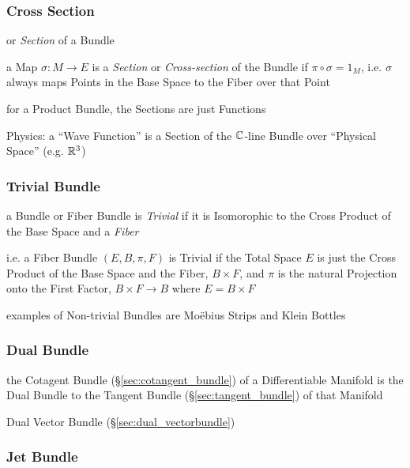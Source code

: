 


\subsubsection{Cross Section}\label{sec:cross_section}

or \emph{Section} of a Bundle

a Map $\sigma : M \to E$ is a \emph{Section} or \emph{Cross-section} of
the Bundle if $\pi \circ \sigma = 1_M$, i.e. $\sigma$ always maps Points in the
Base Space to the Fiber over that Point

for a Product Bundle, the Sections are just Functions

Physics: a ``Wave Function'' is a Section of the $\mathbb{C}$-line Bundle over
``Physical Space'' (e.g. $\mathbb{R}^3$)



\subsubsection{Trivial Bundle}\label{sec:trivial_bundle}

a Bundle or Fiber Bundle is \emph{Trivial} if it is Isomorophic to the Cross
Product of the Base Space and a \emph{Fiber}

i.e. a Fiber Bundle $(E, B, \pi, F)$ is Trivial if the Total Space $E$ is just
the Cross Product of the Base Space and the Fiber, $B \times F$, and $\pi$ is
the natural Projection onto the First Factor, $B \times F \to B$ where
$E = B \times F$

examples of Non-trivial Bundles are Mo\"ebius Strips and Klein Bottles



\subsubsection{Dual Bundle}\label{sec:dual_bundle}

the Cotagent Bundle (\S\ref{sec:cotangent_bundle}) of a Differentiable Manifold
is the Dual Bundle to the Tangent Bundle (\S\ref{sec:tangent_bundle}) of that
Manifold

\fist Dual Vector Bundle (\S\ref{sec:dual_vectorbundle})



\subsubsection{Jet Bundle}\label{sec:jet_bundle}

